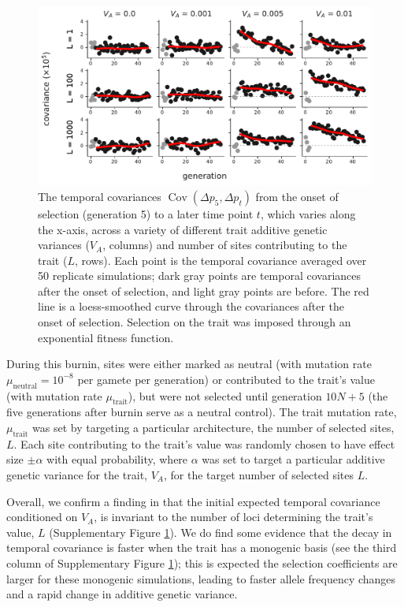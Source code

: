 \documentclass[11pt]{article}
\DeclareMathOperator{\cov}{Cov}
\begin{document}
\begin{figure}[!ht]
  \centering
  \includegraphics[width=\textwidth]{figures/fig-architecture-cov.pdf}

  \caption{The temporal covariances $\cov(\Delta p_5, \Delta p_t)$ from the
    onset of selection (generation 5) to a later time point $t$, which varies
    along the x-axis, across a variety of different trait additive genetic
    variances ($V_A$, columns) and number of sites contributing to the trait
    ($L$, rows). Each point is the temporal covariance averaged over 50
    replicate simulations; dark gray points are temporal covariances after the
    onset of selection, and light gray points are before. The red line is a
    loess-smoothed curve through the covariances after the onset of selection.
    Selection on the trait was imposed through an exponential fitness function.}

  \label{suppfig:sim-expfit-covs}
\end{figure}

During this burnin, sites were either marked as neutral (with mutation rate
$\mu_\mathrm{neutral} = 10^{-8}$ per gamete per generation) or contributed to
the trait's value (with mutation rate $\mu_\mathrm{trait}$), but were not
selected until generation $10N + 5$ (the five generations after burnin serve
as a neutral control). The trait mutation rate, $\mu_\mathrm{trait}$ was set by
targeting a particular architecture, the number of selected sites, $L$. Each
site contributing to the trait's value was randomly chosen to have effect size
$\pm \alpha$ with equal probability, where $\alpha$ was set to target a
particular additive genetic variance for the trait, $V_A$, for the target
number of selected sites $L$. 

Overall, we confirm a finding in \textcite{Buffalo2019-io} that the initial
expected temporal covariance conditioned on $V_A$, is invariant to the number
of loci determining the trait's value, $L$ (Supplementary Figure
\ref{suppfig:sim-expfit-covs}). We do find some evidence that the decay in
temporal covariance is faster when the trait has a monogenic basis (see the
third column of Supplementary Figure \ref{suppfig:sim-expfit-covs}); this is
expected the selection coefficients are larger for these monogenic simulations,
leading to faster allele frequency changes and a rapid change in additive
genetic variance. 
\end{document}
